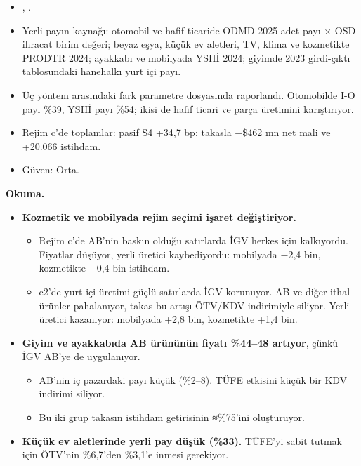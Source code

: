 \begin{itemize}
\tightlist
\item
  \etiketT{} , .
\item
  Yerli payın kaynağı: otomobil ve hafif ticaride ODMD 2025 adet payı × OSD ihracat birim değeri; beyaz eşya, küçük ev aletleri, TV, klima ve kozmetikte PRODTR 2024; ayakkabı ve mobilyada YSHİ 2024; giyimde 2023 girdi-çıktı tablosundaki hanehalkı yurt içi payı.
\item
  Üç yöntem arasındaki fark parametre dosyasında raporlandı. Otomobilde I-O payı \%39, YSHİ payı \%54; ikisi de hafif ticari ve parça üretimini karıştırıyor.
\item
  Rejim c'de toplamlar: pasif S4 +34,7 bp; takasla −\$462 mn net mali ve +20.066 istihdam.
\item
  Güven: Orta.
\end{itemize}

\textbf{Okuma.}

\begin{itemize}
\tightlist
\item
  \textbf{Kozmetik ve mobilyada rejim seçimi işaret değiştiriyor.}

  \begin{itemize}
  \tightlist
  \item
    Rejim c'de AB'nin baskın olduğu satırlarda İGV herkes için kalkıyordu. Fiyatlar düşüyor, yerli üretici kaybediyordu: mobilyada −2,4 bin, kozmetikte −0,4 bin istihdam.
  \item
    c2'de yurt içi üretimi güçlü satırlarda İGV korunuyor. AB ve diğer ithal ürünler pahalanıyor, takas bu artışı ÖTV/KDV indirimiyle siliyor. Yerli üretici kazanıyor: mobilyada +2,8 bin, kozmetikte +1,4 bin.
  \end{itemize}
\item
  \textbf{Giyim ve ayakkabıda AB ürününün fiyatı \%44--48 artıyor}, çünkü İGV AB'ye de uygulanıyor.

  \begin{itemize}
  \tightlist
  \item
    AB'nin iç pazardaki payı küçük (\%2--8). TÜFE etkisini küçük bir KDV indirimi siliyor.
  \item
    Bu iki grup takasın istihdam getirisinin ≈\%75'ini oluşturuyor.
  \end{itemize}
\item
  \textbf{Küçük ev aletlerinde yerli pay düşük (\%33).} TÜFE'yi sabit tutmak için ÖTV'nin \%6,7'den \%3,1'e inmesi gerekiyor.
\end{itemize}

